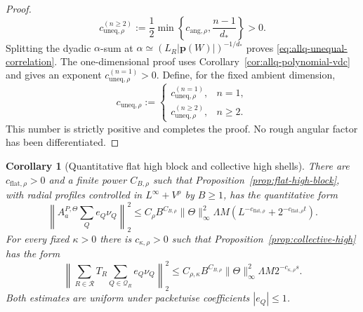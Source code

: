 \documentclass[11pt]{article}
\numberwithin{equation}{section}
\newtheorem{corollary}[theorem]{Corollary}
\theoremstyle{remark}
\theoremstyle{definition}
\begin{document}
\begin{proof}
\begin{equation}
 c_{\mathrm{uneq},\rho}^{(n\ge2)}
 :=\frac12\min\left\{c_{\mathrm{ang},\rho},
                     \frac{n-1}{d_*}\right\}>0.
\end{equation}
Splitting the dyadic $\alpha$-sum at
$\alpha\simeq(L_R|\mathbf p(W)|)^{-1/d_*}$ proves
\eqref{eq:allq-unequal-correlation}. The one-dimensional proof uses
Corollary~\ref{cor:allq-polynomial-vdc} and gives an exponent
$c_{\mathrm{uneq},\rho}^{(n=1)}>0$. Define, for the fixed ambient dimension,
\[
 c_{\mathrm{uneq},\rho}
 :=\begin{cases}
 c_{\mathrm{uneq},\rho}^{(n=1)},&n=1,\\
 c_{\mathrm{uneq},\rho}^{(n\ge2)},&n\ge2.
 \end{cases}
\]
This number is strictly positive and completes the proof.
No rough angular factor has been differentiated.
\end{proof}

\begin{corollary}[Quantitative flat high block and collective high shells]
\label{cor:allq-high-shell-stability}
There are $c_{\mathrm{flat},\rho}>0$ and a finite power $C_{B,\rho}$ such
that Proposition~\ref{prop:flat-high-block}, with radial profiles
controlled in $L^\infty+V^\rho$ by $B\ge1$, has the quantitative form
\begin{equation}\label{eq:allq-flat-high-block}
 \left\|A^{P,\Theta}_a\sum_Qe_Q\nu_Q\right\|_2^2
 \le C_\rho B^{C_{B,\rho}}\|\Theta\|_\infty^2\Lambda M
       (L^{-c_{\mathrm{flat},\rho}}+2^{-c_{\mathrm{flat},\rho}t}).
\end{equation}
For every fixed $\kappa>0$ there is
$c_{\kappa,\rho}>0$ such that Proposition~\ref{prop:collective-high} has
the form
\begin{equation}\label{eq:allq-collective-high}
 \left\|\sum_{R\in\mathcal R}T_R
       \sum_{Q\in\mathcal Q_R}e_Q\nu_Q\right\|_2^2
 \le C_{\rho,\kappa}B^{C_{B,\rho}}\|\Theta\|_\infty^2
       \Lambda M2^{-c_{\kappa,\rho}s}.
\end{equation}
Both estimates are uniform under packetwise coefficients $|e_Q|\le1$.
\end{corollary}
\end{document}
